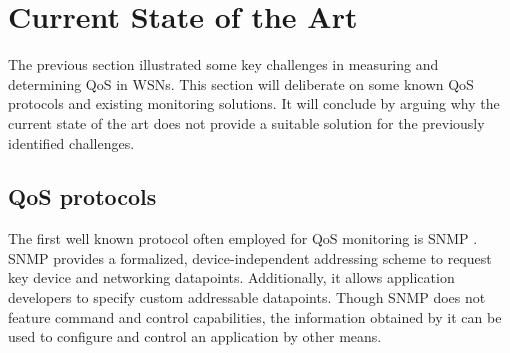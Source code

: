 

\section{Current State of the Art}
The previous section illustrated some key challenges in measuring and determining QoS in WSNs. This section will deliberate on some known QoS protocols and existing monitoring solutions. It will conclude by arguing why the current state of the art does not provide a suitable solution for the previously identified challenges.

\subsection{QoS protocols}
\label{sec:qos-protocols}
The first well known protocol often employed for QoS monitoring is SNMP \cite{snmp}. SNMP provides a formalized, device-independent addressing scheme to request key device and networking datapoints. Additionally, it allows application developers to specify custom addressable datapoints. Though SNMP does not feature command and control capabilities, the information obtained by it can be used to configure and control an application by other means.

